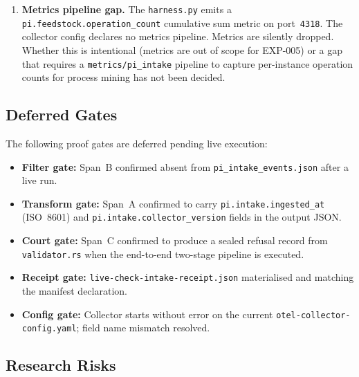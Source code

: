 \begin{enumerate}
  \item \textbf{Metrics pipeline gap.} The \texttt{harness.py} emits a
        \texttt{pi.feedstock.operation\_count} cumulative sum metric on port~\texttt{4318}.
        The collector config declares no metrics pipeline. Metrics are silently dropped.
        Whether this is intentional (metrics are out of scope for EXP-005) or a gap that
        requires a \texttt{metrics/pi\_intake} pipeline to capture per-instance operation
        counts for process mining has not been decided.
\end{enumerate}

\subsection{Deferred Gates}
\label{sec:otel-weaver-exp-005-collector-to-intake-open-questions-deferred}

The following proof gates are deferred pending live execution:

\begin{itemize}
  \item \textbf{Filter gate:} Span~B confirmed absent from \texttt{pi\_intake\_events.json}
        after a live run.
  \item \textbf{Transform gate:} Span~A confirmed to carry \texttt{pi.intake.ingested\_at}
        (ISO~8601) and \texttt{pi.intake.collector\_version} fields in the output JSON.
  \item \textbf{Court gate:} Span~C confirmed to produce a sealed refusal record from
        \texttt{validator.rs} when the end-to-end two-stage pipeline is executed.
  \item \textbf{Receipt gate:} \texttt{live-check-intake-receipt.json} materialised and
        matching the manifest declaration.
  \item \textbf{Config gate:} Collector starts without error on the current
        \texttt{otel-collector-config.yaml}; field name mismatch resolved.
\end{itemize}

\subsection{Research Risks}
\label{sec:otel-weaver-exp-005-collector-to-intake-open-questions-risks}

